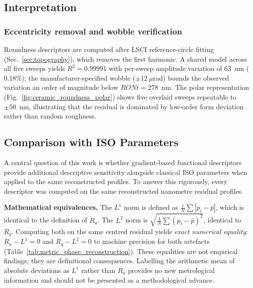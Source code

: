 \documentclass[review]{elsarticle}
\begin{document}
\subsection{Interpretation}

\subsubsection{Eccentricity removal and wobble verification}
Roundness descriptors are computed after LSCI reference-circle fitting (Sec.~\ref{sec:topography}), which removes the first harmonic. A shared model across all five sweeps yields $R^2=0.99991$ with per-sweep amplitude variation of 63~nm ($0.18\%$); the manufacturer-specified wobble ($\pm 12~\mu$rad) bounds the observed variation an order of magnitude below $RONt=278$~nm. The polar representation (Fig.~\ref{fig:ceramic_roundness_polar}) shows five overlaid sweeps repeatable to $\pm 50$~nm, illustrating that the residual is dominated by low-order form deviation rather than random roughness.

\subsection{Comparison with ISO Parameters}
\label{sec:critical}

A central question of this work is whether gradient-based functional descriptors provide additional descriptive sensitivity alongside classical ISO parameters when applied to the same reconstructed profiles. To answer this rigorously, every descriptor was computed on the same reconstructed nanometre residual profiles.

\textbf{Mathematical equivalences.} The $L^1$ norm is defined as $\frac{1}{N}\sum|p_i-\bar{p}|$, which is identical to the definition of $R_a$. The $L^2$ norm is $\sqrt{\frac{1}{N}\sum(p_i-\bar{p})^2}$, identical to $R_q$. Computing both on the same centred residual yields \emph{exact numerical equality}: $R_a-L^1=0$ and $R_q-L^2=0$ to machine precision for both artefacts (Table~\ref{tab:metric_phase_reconstruction}). These equalities are not empirical findings; they are definitional consequences. Labelling the arithmetic mean of absolute deviations as $L^1$ rather than $R_a$ provides no new metrological information and should not be presented as a methodological advance.
\end{document}
